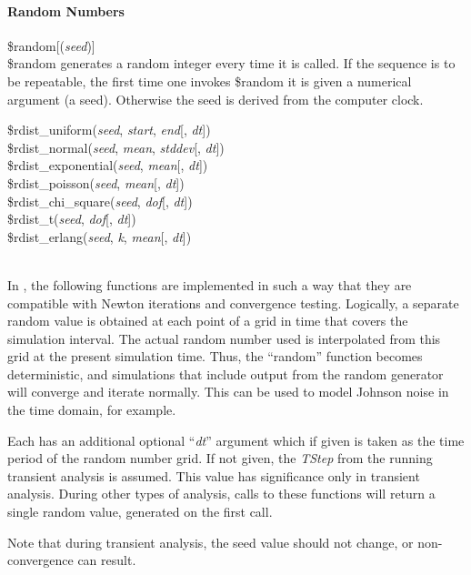 \paragraph{Random Numbers}

\begin{description}
\item{\vt \$random}[({\it seed\/})]\\
{\vt \$random} generates a random integer every time it is called.  If
the sequence is to be repeatable, the first time one invokes {\vt
\$random} it is given a numerical argument (a seed).  Otherwise the
seed is derived from the computer clock.

\item{\parbox{4in}{
{\vt \$rdist\_uniform}({\it seed\/}, {\it start\/}, {\it end\/}[, {\it dt\/}])\\
{\vt \$rdist\_normal}({\it seed\/}, {\it mean\/}, {\it stddev\/}[, {\it dt\/}])\\
{\vt \$rdist\_exponential}({\it seed\/}, {\it mean\/}[, {\it dt\/}])\\
{\vt \$rdist\_poisson}({\it seed\/}, {\it mean\/}[, {\it dt\/}])\\
{\vt \$rdist\_chi\_square}({\it seed\/}, {\it dof\/}[, {\it dt\/}])\\
{\vt \$rdist\_t}({\it seed\/}, {\it dof\/}[, {\it dt\/}])\\
{\vt \$rdist\_erlang}({\it seed\/}, {\it k\/}, {\it mean\/}[, {\it dt\/}])}}\\
In {\WRspice}, the following functions are implemented in such a way
that they are compatible with Newton iterations and convergence
testing.  Logically, a separate random value is obtained at each point
of a grid in time that covers the simulation interval.  The actual
random number used is interpolated from this grid at the present
simulation time.  Thus, the ``random'' function becomes deterministic,
and simulations that include output from the random generator will
converge and iterate normally.  This can be used to model Johnson
noise in the time domain, for example.

Each has an additional optional ``{\it dt\/}'' argument which if given
is taken as the time period of the random number grid.  If not given,
the {\it TStep} from the running transient analysis is assumed.  This
value has significance only in transient analysis.  During other types
of analysis, calls to these functions will return a single random
value, generated on the first call.

Note that during transient analysis, the seed value should not change,
or non-convergence can result.


\end{description}
